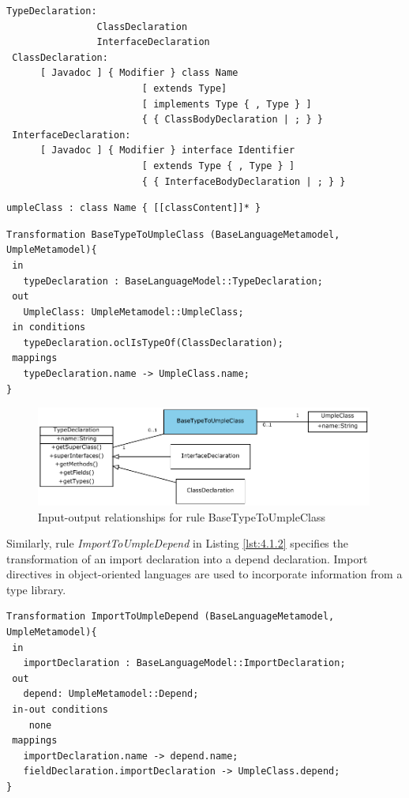 \begin{lstlisting}[style=mine,caption=Grammar for Java types,label=lst:javaGrammar1]
TypeDeclaration:
                ClassDeclaration
                InterfaceDeclaration
 ClassDeclaration:
      [ Javadoc ] { Modifier } class Name
                        [ extends Type]
                        [ implements Type { , Type } ]
                        { { ClassBodyDeclaration | ; } }
 InterfaceDeclaration:
      [ Javadoc ] { Modifier } interface Identifier
                        [ extends Type { , Type } ]
                        { { InterfaceBodyDeclaration | ; } }
\end{lstlisting}

\begin{lstlisting}[style=mine,caption=Grammar for Umple classes,label=lst:umpleGrammar2]
 umpleClass : class Name { [[classContent]]* }
\end{lstlisting}

\begin{lstlisting}[style=mine,caption=Rule BaseTypeToUmpleClass,label=lst:4.1.1]
Transformation BaseTypeToUmpleClass (BaseLanguageMetamodel, UmpleMetamodel){ 
 in
   typeDeclaration : BaseLanguageModel::TypeDeclaration;
 out
   UmpleClass: UmpleMetamodel::UmpleClass;
 in conditions
   typeDeclaration.oclIsTypeOf(ClassDeclaration);   
 mappings
   typeDeclaration.name -> UmpleClass.name;
}
\end{lstlisting}

\begin{figure}[h]
\centering
\includegraphics[width=0.99\textwidth]{Figures/ch4InitialMapping.pdf}
\caption{Input-output relationships for rule BaseTypeToUmpleClass}
\label{fig:4.1.1}
\end{figure}

Similarly, rule  \textit{ImportToUmpleDepend} in Listing \ref{lst:4.1.2} specifies the transformation of an import declaration into a depend declaration. Import directives in object-oriented languages are used to incorporate information from a type library. 

\begin{lstlisting}[style=mine,caption=Rule JavaImportToUmpleDepend,label=lst:4.1.2]
Transformation ImportToUmpleDepend (BaseLanguageMetamodel, UmpleMetamodel){ 
 in
   importDeclaration : BaseLanguageModel::ImportDeclaration;
 out
   depend: UmpleMetamodel::Depend;
 in-out conditions
	none
 mappings
   importDeclaration.name -> depend.name;
   fieldDeclaration.importDeclaration -> UmpleClass.depend;
}
\end{lstlisting}

